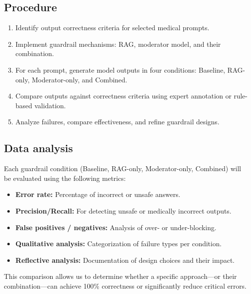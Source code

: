 \subsection{Procedure}

\begin{enumerate}
    \item Identify output correctness criteria for selected medical prompts.
    \item Implement guardrail mechanisms: RAG, moderator model, and their combination.
    \item For each prompt, generate model outputs in four conditions: Baseline, RAG-only, Moderator-only, and Combined.
    \item Compare outputs against correctness criteria using expert annotation or rule-based validation.
    \item Analyze failures, compare effectiveness, and refine guardrail designs.
\end{enumerate}

\subsection{Data analysis}

Each guardrail condition (Baseline, RAG-only, Moderator-only, Combined) will be evaluated using the following metrics:

\begin{itemize}
    \item \textbf{Error rate:} Percentage of incorrect or unsafe answers.
    \item \textbf{Precision/Recall:} For detecting unsafe or medically incorrect outputs.
    \item \textbf{False positives / negatives:} Analysis of over- or under-blocking.
    \item \textbf{Qualitative analysis:} Categorization of failure types per condition.
    \item \textbf{Reflective analysis:} Documentation of design choices and their impact.
\end{itemize}

This comparison allows us to determine whether a specific approach—or their combination—can achieve 100\% correctness or significantly reduce critical errors.

